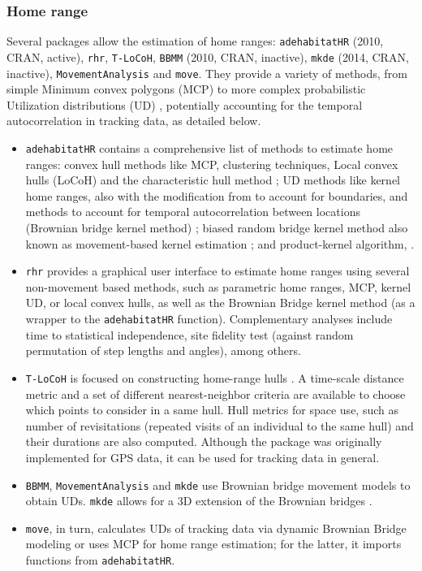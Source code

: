 \documentclass[a4paper,12pt]{article}
\newcommand{\Rpkg}[1]{\texttt{#1}}
\begin{document}
\subsubsection*{Home range}

Several packages allow the estimation of home ranges: \Rpkg{adehabitatHR} (2010, CRAN, active), \Rpkg{rhr}, \Rpkg{T-LoCoH}, \Rpkg{BBMM} (2010, CRAN, inactive), \Rpkg{mkde} (2014, CRAN, inactive), \Rpkg{MovementAnalysis} and \Rpkg{move}. They provide a variety of methods, from simple Minimum convex polygons (MCP) \citep{Mohr1947} to more complex probabilistic Utilization distributions (UD) \citep{VanWinkle1975}, potentially accounting for the temporal autocorrelation in tracking data, as detailed below.

\begin{itemize}
        \item \Rpkg{adehabitatHR} contains a comprehensive list of methods to estimate home ranges: convex hull methods like MCP, clustering techniques, Local convex hulls (LoCoH) \citep{Getz2007} and the characteristic hull method \cite{Downs2009}; UD methods like kernel home ranges, also with the modification from \cite{Benhamou2010} to account for boundaries, and methods to account for temporal autocorrelation between locations (Brownian bridge kernel method) \citep{Bullard1991}; biased random bridge kernel method also known as movement-based kernel estimation \citep{Benhamou2010, Benhamou2011}; and product-kernel algorithm, \cite{Horne2007}.
        \item \Rpkg{rhr} \citep{Signer2015} provides a graphical user interface to estimate home ranges using several non-movement based methods, such as parametric home ranges, MCP, kernel UD, or local convex hulls, as well as the Brownian Bridge kernel method (as a wrapper to the \Rpkg{adehabitatHR} function). Complementary analyses include time to statistical independence, site fidelity test (against random permutation of step lengths and angles), among others.
        \item \Rpkg{T-LoCoH} is focused on constructing home-range hulls \citep{Lyons2013}. A time-scale distance metric and a set of different nearest-neighbor criteria are available to choose which points to consider in a same hull. Hull metrics for space use, such as number of revisitations (repeated visits of an individual to the same hull) and their durations are also computed. Although the package was originally implemented for GPS data, it can be used for tracking data in general. 
        \item \Rpkg{BBMM}, \Rpkg{MovementAnalysis} and \Rpkg{mkde} use Brownian bridge movement models to obtain UDs. \Rpkg{mkde} allows for a 3D extension of the Brownian bridges \citep{Tracey2014}.
        \item \Rpkg{move}, in turn, calculates UDs of tracking data via dynamic Brownian Bridge modeling \citep{Kranstauber2012} or uses MCP for home range estimation; for the latter, it imports functions from \Rpkg{adehabitatHR}.
\end{itemize}
\end{document}
